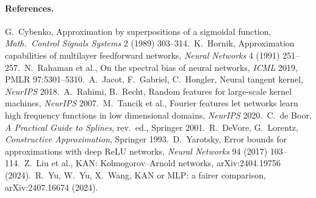 \documentclass[11pt,a4paper]{article}
\begin{document}
\paragraph{References.}
G.~Cybenko, Approximation by superpositions of a sigmoidal function, \emph{Math.\ Control Signals Systems} 2 (1989) 303--314.\
K.~Hornik, Approximation capabilities of multilayer feedforward networks, \emph{Neural Networks} 4 (1991) 251--257.\
N.~Rahaman et al., On the spectral bias of neural networks, \emph{ICML} 2019, PMLR 97:5301--5310.\
A.~Jacot, F.~Gabriel, C.~Hongler, Neural tangent kernel, \emph{NeurIPS} 2018.\
A.~Rahimi, B.~Recht, Random features for large-scale kernel machines, \emph{NeurIPS} 2007.\
M.~Tancik et al., Fourier features let networks learn high frequency functions in low dimensional domains, \emph{NeurIPS} 2020.\
C.~de Boor, \emph{A Practical Guide to Splines}, rev.\ ed., Springer 2001.\
R.~DeVore, G.~Lorentz, \emph{Constructive Approximation}, Springer 1993.\
D.~Yarotsky, Error bounds for approximations with deep ReLU networks, \emph{Neural Networks} 94 (2017) 103--114.\
Z.~Liu et al., KAN: Kolmogorov--Arnold networks, arXiv:2404.19756 (2024).\
R.~Yu, W.~Yu, X.~Wang, KAN or MLP: a fairer comparison, arXiv:2407.16674 (2024).
\end{document}

